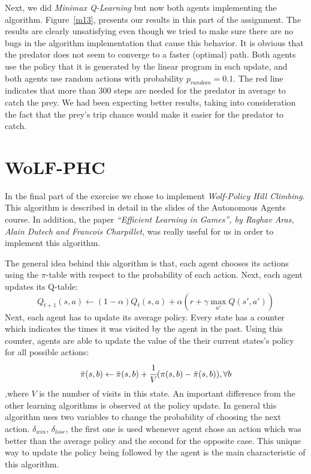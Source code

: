 \documentclass[a4paper,11pt]{article}
\begin{document}
Next, we did \textit{Minimax Q-Learning} but now both agents implementing the algorithm. Figure~\ref{m13},  presents our results in this part of the assignment. The results are clearly unsatisfying even though we tried to make sure there are no bugs in the algorithm implementation that cause this behavior. It is obvious that the predator does not seem to converge to a faster (optimal) path. Both agents use the policy that it is generated by the linear program in each update, and both agents use random actions with probability $p_{random} = 0.1$. The red line indicates that more than 300 steps are needed for the predator in average to catch the prey. We had been expecting better results, taking into consideration the fact that the prey's trip chance would make it easier for the predator to catch.


\section{WoLF-PHC}
In the final part of the exercise we chose to implement \textit{Wolf-Policy Hill Climbing}. This algorithm is described in detail in the slides of the Autonomous Agents course. In addition, the paper \textit{``Efficient Learning in Games'', by Raghav Aras, Alain Dutech and Francois Charpillet}, was really useful for us in order to implement this algorithm.

The general idea behind this algorithm is that, each agent chooses its actions using the $\pi$-table with respect to the probability of each action. Next, each agent updates its Q-table:
\[
Q_{t+1}(s,a) \leftarrow (1-\alpha)Q_{t}(s,a)+\alpha(r + \gamma \max_{a'}Q(s',a'))
\]
Next, each agent has to update its average policy. Every state has a counter which indicates the times it was visited by the agent in the past. Using this counter, agents are able to update the value of the their current states's policy for all possible actions:
\[
\bar{\pi}(s,b) \leftarrow \bar{\pi}(s,b) + \cfrac{1}{V} (\pi(s,b) - \bar{\pi}(s,b)), \forall b
\]
,where $V$ is the number of visits in this state. An important difference from the other learning algorithms is observed at the policy update. In general this algorithm uses two variables to change the probability of choosing the next action. $\delta_{win}$, $\delta_{lose}$, the first one is used whenever agent chose an action which was better than the average policy and the second for the opposite case. This unique way to update the policy being followed by the agent is the main characteristic of this algorithm.
\end{document}
